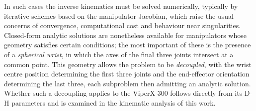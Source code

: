 In such cases the inverse kinematics must be solved numerically, typically by iterative
schemes based on the manipulator Jacobian, which raise the usual concerns of
convergence, computational cost and behaviour near singularities. Closed-form analytic
solutions are nonetheless available for manipulators whose geometry satisfies certain
conditions; the most important of these is the presence of a \textit{spherical wrist},
in which the axes of the final three joints intersect at a common point. This geometry
allows the problem to be \textit{decoupled}, with the wrist centre position determining
the first three joints and the end-effector orientation determining the last three,
each subproblem then admitting an analytic solution. Whether such a decoupling applies
to the ViperX-300 follows directly from its D-H parameters and is examined in the
kinematic analysis of this work.
